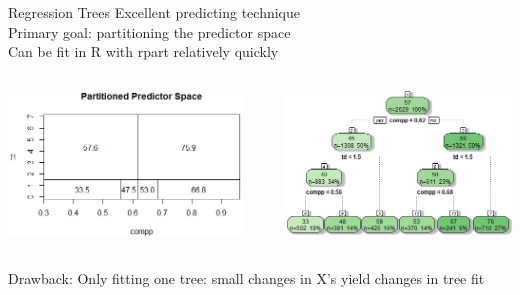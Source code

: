 \documentclass{beamer}
\begin{document}
	\begin{frame}{Regression Trees}
		Excellent predicting technique\\
		Primary goal: partitioning the predictor space\\
		Can be fit in R with rpart relatively quickly\\
		\vspace{20pt}
		\begin{columns}
			\begin{column}[t]{0.5\textwidth}
				\includegraphics[scale=.45]{expartspace.jpeg}
			\end{column}
			\begin{column}{0.08\textwidth}
			\end{column}
			\begin{column}[t]{\dimexpr\paperwidth-20pt}
				\includegraphics[scale=.5]{extree.jpeg}
			\end{column}
		\end{columns}
		Drawback: Only fitting one tree: small changes in X's yield changes in tree fit\\
	\end{frame}
\end{document}
